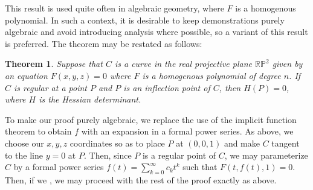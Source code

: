 \documentclass[12pt]{article}
\newtheorem{thm}{Theorem}
\begin{document}
This result is used quite often in algebraic geometry,
where $F$ is a homogenous polynomial.  In such a context,
it is desirable to keep demonstrations purely
algebraic and avoid introducing analysis where possible, 
so a variant of this result is preferred.  The theorem 
may be restated as follows:

\begin{thm}
Suppose that $C$ is a curve in the real projective plane 
$\mathbb{R}\mathbb{P}^2$ given by an equation $F(x,y,z) = 0$ 
where $F$ is a homogenous polynomial of degree $n$.
If $C$ is regular at a point $P$ and $P$ is an inflection point 
of $C$, then $H(P) = 0$, where $H$ is the Hessian determinant.
\end{thm}

To make our proof purely algebraic, we replace the use of
the implicit function theorem to obtain $f$ with an expansion
in a formal power series.  As above, we choose our $x,y,z$ 
coordinates so as to place $P$ at $(0,0,1)$ and make $C$
tangent to the line $y=0$ at $P$.  Then, since $P$ is a regular
point of $C$, we may parameterize $C$ by a formal power series
$f(t) = \sum_{k=0}^\infty c_k t^k$ such that $F(t,f(t),1) = 0$.
Then, if we 
,
we may proceed with the rest of the proof exactly as above.

\end{document}

